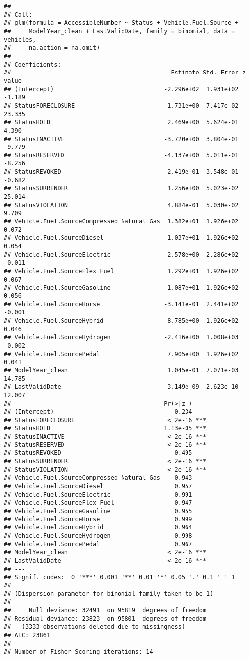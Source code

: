 \documentclass[
]{article}
\begin{document}
\begin{verbatim}
## 
## Call:
## glm(formula = AccessibleNumber ~ Status + Vehicle.Fuel.Source + 
##     ModelYear_clean + LastValidDate, family = binomial, data = vehicles, 
##     na.action = na.omit)
## 
## Coefficients:
##                                             Estimate Std. Error z value
## (Intercept)                               -2.296e+02  1.931e+02  -1.189
## StatusFORECLOSURE                          1.731e+00  7.417e-02  23.335
## StatusHOLD                                 2.469e+00  5.624e-01   4.390
## StatusINACTIVE                            -3.720e+00  3.804e-01  -9.779
## StatusRESERVED                            -4.137e+00  5.011e-01  -8.256
## StatusREVOKED                             -2.419e-01  3.548e-01  -0.682
## StatusSURRENDER                            1.256e+00  5.023e-02  25.014
## StatusVIOLATION                            4.884e-01  5.030e-02   9.709
## Vehicle.Fuel.SourceCompressed Natural Gas  1.382e+01  1.926e+02   0.072
## Vehicle.Fuel.SourceDiesel                  1.037e+01  1.926e+02   0.054
## Vehicle.Fuel.SourceElectric               -2.578e+00  2.286e+02  -0.011
## Vehicle.Fuel.SourceFlex Fuel               1.292e+01  1.926e+02   0.067
## Vehicle.Fuel.SourceGasoline                1.087e+01  1.926e+02   0.056
## Vehicle.Fuel.SourceHorse                  -3.141e-01  2.441e+02  -0.001
## Vehicle.Fuel.SourceHybrid                  8.785e+00  1.926e+02   0.046
## Vehicle.Fuel.SourceHydrogen               -2.416e+00  1.008e+03  -0.002
## Vehicle.Fuel.SourcePedal                   7.905e+00  1.926e+02   0.041
## ModelYear_clean                            1.045e-01  7.071e-03  14.785
## LastValidDate                              3.149e-09  2.623e-10  12.007
##                                           Pr(>|z|)    
## (Intercept)                                  0.234    
## StatusFORECLOSURE                          < 2e-16 ***
## StatusHOLD                                1.13e-05 ***
## StatusINACTIVE                             < 2e-16 ***
## StatusRESERVED                             < 2e-16 ***
## StatusREVOKED                                0.495    
## StatusSURRENDER                            < 2e-16 ***
## StatusVIOLATION                            < 2e-16 ***
## Vehicle.Fuel.SourceCompressed Natural Gas    0.943    
## Vehicle.Fuel.SourceDiesel                    0.957    
## Vehicle.Fuel.SourceElectric                  0.991    
## Vehicle.Fuel.SourceFlex Fuel                 0.947    
## Vehicle.Fuel.SourceGasoline                  0.955    
## Vehicle.Fuel.SourceHorse                     0.999    
## Vehicle.Fuel.SourceHybrid                    0.964    
## Vehicle.Fuel.SourceHydrogen                  0.998    
## Vehicle.Fuel.SourcePedal                     0.967    
## ModelYear_clean                            < 2e-16 ***
## LastValidDate                              < 2e-16 ***
## ---
## Signif. codes:  0 '***' 0.001 '**' 0.01 '*' 0.05 '.' 0.1 ' ' 1
## 
## (Dispersion parameter for binomial family taken to be 1)
## 
##     Null deviance: 32491  on 95819  degrees of freedom
## Residual deviance: 23823  on 95801  degrees of freedom
##   (3333 observations deleted due to missingness)
## AIC: 23861
## 
## Number of Fisher Scoring iterations: 14
\end{verbatim}
\end{document}
